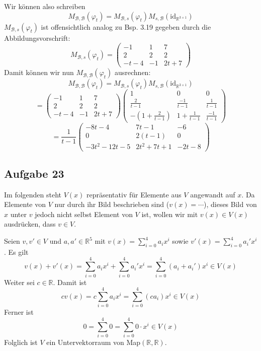 \documentclass[a4paper,graphics,11pt]{article}
\newcommand{\aufgabe}[1]{\subsection*{Aufgabe #1}}
\begin{document}
Wir können also schreiben
$$
    M_{\mathcal{B}, \mathcal{B}}(\varphi_t)
    = M_{\mathcal{B}, s}(\varphi_t)
        M_{s, \mathcal{B}}(\text{id}_{\mathbb{R}^{3\times 1}})
$$
$M_{\mathcal{B}, s}(\varphi_t)$ ist offensichtlich analog zu Bsp. 3.19 gegeben durch die Abbildungsvorschrift:
$$
M_{\mathcal{B}, s}(\varphi_t) =
    \begin{pmatrix}
        -1 & 1 & 7\\
        2 & 2 & 2\\
        -t-4 & -1 & 2t+7
    \end{pmatrix}
$$
\newpage
Damit können wir nun $M_{\mathcal{B}, \mathcal{B}}(\varphi_t)$ ausrechnen:
$$
    M_{\mathcal{B}, \mathcal{B}}(\varphi_t)
    = M_{\mathcal{B}, s}(\varphi_t)
        M_{s, \mathcal{B}}(\text{id}_{\mathbb{R}^{3\times 1}})
$$$$
    = \begin{pmatrix}
        -1 & 1 & 7\\
        2 & 2 & 2\\
        -t-4 & -1 & 2t+7
    \end{pmatrix}
    \begin{pmatrix}
        1 & 0 & 0\\[5pt]
        \frac{2}{t-1} & \frac{-1}{t-1} & \frac{1}{t-1}\\[5pt]
        -(1+\frac{2}{t-1}) & 1+\frac{1}{t-1} & \frac{-1}{t-1}
    \end{pmatrix}
$$$$
    = \frac{1}{t-1} \begin{pmatrix}
        -8t-4 & 7t-1 & -6\\
        0 & 2(t-1) & 0\\
        -3t^2-12t-5 & 2t^2+7t+1 & -2t-8
    \end{pmatrix}
$$

\aufgabe{23}

Im folgenden steht $V(x)$ repräsentativ für Elemente aus $V$ angewandt auf $x$.
Da Elemente von $V$ nur durch ihr Bild beschrieben sind ($v(x) = \cdots$),
dieses Bild von $x$ unter $v$ jedoch nicht selbst Element von $V$ ist, wollen wir mit $v(x) \in V(x)$ ausdrücken, dass $v \in V$.

Seien $v,v' \in V$ und $a,a' \in \mathbb{R}^5$ mit $v(x) = \sum_{i=0}^{4} a_ix^i$ sowie $v'(x) = \sum_{i=0}^{4} a_i' x^i$. Es gilt
$$
    v(x)+v'(x)
    = \sum_{i=0}^{4} a_ix^i + \sum_{i=0}^{4} a_i'x^i
    = \sum_{i=0}^{4} (a_i+a_i')x^i \in V(x)
$$
Weiter sei $c \in \mathbb{R}$. Damit ist
$$
    cv(x)
    = c\sum_{i=0}^{4} a_ix^i
    = \sum_{i=0}^{4} (ca_i)x^i \in V(x)
$$
Ferner ist
$$
    0
    = \sum_{i=0}^{4} 0
    = \sum_{i=0}^{4} 0\cdot x^i \in V(x)
$$
Folglich ist $V$ ein Untervektorraum von Map$(\mathbb{R}, \mathbb{R})$.
\end{document}
